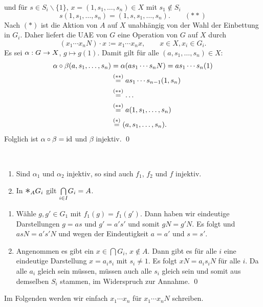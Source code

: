\documentclass[a4paper, 12pt, twoside]{article}
\begin{document}
und für $s\in S_i\backslash\{1\}$, $x=(1,s_1,\ldots,s_n)\in X$ mit
$s_1\not\in S_i$
\[
s(1,s_1,\ldots,s_n) = (1,s,s_1,\ldots,s_n). \qquad (**)
\]
Nach $(*)$ ist die Aktion von $A$ auf $X$ unabhängig von der Wahl
der Einbettung in $G_i$. Daher liefert die UAE von $G$ eine
Operation von $G$ auf $X$ durch
\[
(x_1\cdots x_n N)\cdot x := x_1\cdots x_n x,\qquad x\in X, x_i\in G_i.
\]
Es sei $\alpha:G\Ra X$, $g\mapsto g (1)$.
Damit gilt für alle $(a,s_1,\ldots,s_n)\in X$:
\begin{align*}
\alpha\circ\beta(a,s_1,\ldots,s_n)
&= \alpha(a s_1\cdots s_n N) = a s_1\cdots s_n (1) \\
&\os{=}{(**)} a s_1\cdots s_{n-1}(1,s_n) \\
&\os{=}{(**)} \ldots \\
&\os{=}{(**)} a(1,s_1,\ldots,s_n) \\
&\os{=}{(*)} (a,s_1,\ldots,s_n).
\end{align*}
Folglich ist $\alpha\circ\beta=\id$ und $\beta$ injektiv.
\qed

\FOLG\
\begin{enumerate}
\item Sind $\alpha_1$ und $\alpha_2$ injektiv, so sind auch
$f_1$, $f_2$ und $f$ injektiv.
\item In $\AST_{A} G_i$ gilt $\BCAP{}{i\in I} G_i = A$.
\end{enumerate}
\bew
\begin{enumerate}
\item Wähle $g,g'\in G_1$ mit $f_1(g)=f_1(g')$.
Dann haben wir eindeutige Darstellungen $g=as$ und $g'=a's'$
und somit $gN=g'N$. Es folgt und $asN=a's'N$ und wegen der
Eindeutigkeit $a=a'$ und $s=s'$.
\item Angenommen es gibt ein $x\in \bigcap G_i$, $x\not\in A$.
Dann gibt es für alle $i$ eine eindeutige Darstellung
$x=a_i s_i$ mit $s_i\neq 1$.
Es folgt $xN=a_i s_i N$ für alle $i$.
Da alle $a_i$ gleich sein müssen, müssen auch alle $s_i$ gleich sein
und somit aus demselben $S_i$ stammen, im Widerspruch zur Annahme.
\qed
\end{enumerate}

Im Folgenden werden wir einfach $x_1\cdots x_n$ für
$x_1\cdots x_n N$ schreiben.
\end{document}

